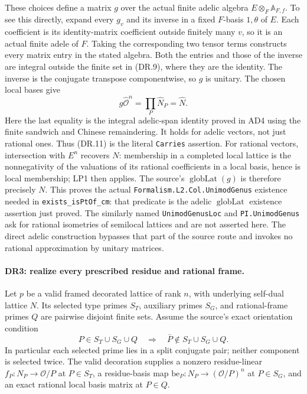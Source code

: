 \documentclass[11pt,a4paper]{article}
\numberwithin{equation}{section}
\theoremstyle{remark}\newtheorem{remark}[theorem]{Remark}
\begin{document}
These choices define a matrix $g$ over the actual finite adelic
algebra $E\otimes_F\mathbb A_{F,f}$. To see this directly, expand
every $g_v$ and its inverse in a fixed $F$-basis $1,\theta$ of $E$.
Each coefficient is its identity-matrix coefficient outside finitely
many $v$, so it is an actual finite adele of $F$. Taking the corresponding
two tensor terms constructs every matrix entry in the stated algebra.
Both the entries and those of the inverse are integral outside the
finite set in (DR.9), where they are the identity.
The inverse is the conjugate transpose
componentwise, so $g$ is unitary. The chosen local bases give
\[
          g\widehat{\mathcal O}^{n}
                    =\prod_P\widehat N_P=\widehat N.
 \tag{DR.11}
\]
Here the last equality is the integral adelic-span identity proved
in AD4 using the finite sandwich and Chinese remaindering. It holds
for adelic vectors, not just rational ones. Thus (DR.11) is the
literal \texttt{Carries} assertion.
For rational vectors, intersection with $E^n$ recovers $N$: membership
in a completed local lattice is the nonnegativity of the valuations
of its rational coefficients in a local basis, hence is local
membership; LP1 then applies. The source's
$\operatorname{globLat}(g)$ is therefore precisely $N$.
This proves the actual \texttt{Formalism.L2.Col.UnimodGenus}
existence needed in \texttt{exists\_\allowbreak isPtOf\_\allowbreak cm}: that predicate is
the adelic $\operatorname{globLat}$ existence assertion just proved.
The similarly named \texttt{UnimodGenusLoc} and
\texttt{PI.UnimodGenus} ask for rational isometries of semilocal
lattices and are not asserted here. The direct adelic construction
bypasses that part of the source route and invokes no rational
approximation by unitary matrices.

\paragraph{DR3: realize every prescribed residue and rational frame.}
Let $p$ be a valid framed decorated lattice of rank $n$, with
underlying self-dual lattice $N$. Its selected type primes $S_T$,
auxiliary primes $S_G$, and rational-frame primes $Q$ are pairwise
disjoint finite sets. Assume the source's exact orientation condition
\[
 P\in S_T\cup S_G\cup Q
       \quad\Longrightarrow\quad
 \bar P\notin S_T\cup S_G\cup Q.                    \tag{DR.12}
\]
In particular each selected prime lies in a split conjugate pair;
neither component is selected twice. The valid decoration supplies
a nonzero residue-linear $f_P:N_P\to\mathcal O/P$ at $P\in S_T$,
a residue-basis map $\mathrm{be}_P:N_P\to(\mathcal O/P)^n$ at
$P\in S_G$, and an exact rational local basis matrix at $P\in Q$.
\end{document}
